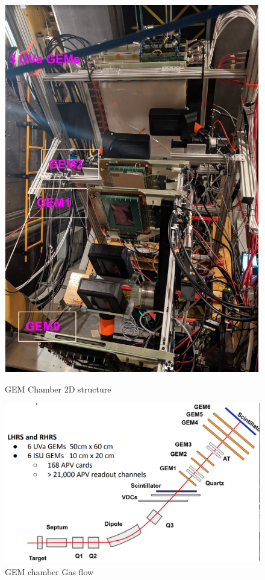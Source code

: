 \begin{figure}[!htbp]
  \centering
  \begin{minipage}[b]{0.45\textwidth}
    \includegraphics[width=\textwidth]{images/chap5/gem_in_apparatus_photo.png}
    \caption{GEM Chamber 2D structure}
  \end{minipage}
  \hfill
  \begin{minipage}[b]{0.45\textwidth}
    \includegraphics[width=\textwidth]{images/chap5/gem_apparatus_in_hrs_2d.png}
    \caption{GEM chamber Gas flow}
  \end{minipage}
\end{figure}


